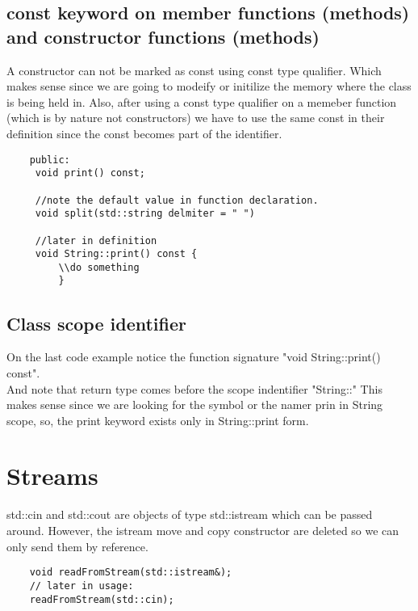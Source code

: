 \documentclass[11pt,twoside,a4paper]{report}
\begin{document}
\section{const keyword on member functions (methods) and constructor functions (methods)}
A constructor can not be marked as const using const type qualifier. Which makes sense since we are going to modeify or initilize the memory where the class is being held in.
Also, after using a const type qualifier on a memeber function (which is by nature not constructors) we have to use the same const in their definition since the const becomes part of the
identifier.

\begin{lstlisting}
    public:
     void print() const;

     //note the default value in function declaration.
     void split(std::string delmiter = " ")

     //later in definition
     void String::print() const {
         \\do something
         }
\end{lstlisting}

\section{Class scope identifier}
On the last code example notice the function signature "void String::print() const".\\
And note that return type comes before the scope indentifier "String::" This makes sense since we are looking for the symbol or the namer prin in String scope,
so, the print keyword exists only in String::print form.

\chapter{Streams}
std::cin and std::cout are objects of type std::istream which can be passed around. However, the istream move and copy constructor are deleted so we can only send them by reference.

\begin{lstlisting}
    void readFromStream(std::istream&);
    // later in usage:
    readFromStream(std::cin);
\end{lstlisting}
\end{document}
